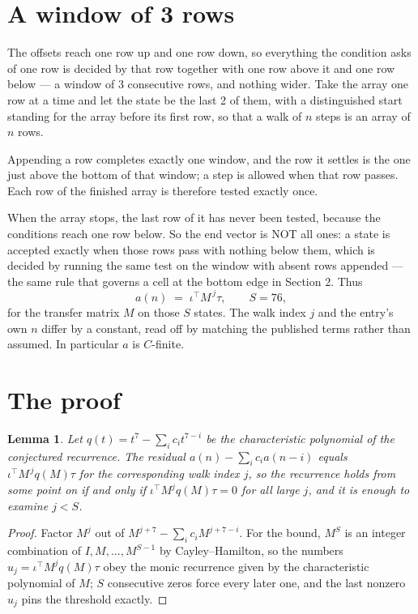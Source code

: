 \documentclass[11pt,a4paper]{article}
\theoremstyle{plain}
\newtheorem{lemma}[theorem]{Lemma}
\theoremstyle{definition}
\begin{document}
\section{A window of 3 rows}

The offsets reach one row up and one row down, so everything the condition asks of one row is
decided by that row together with one row above it and one row below --- a window of
$3$ consecutive rows, and nothing wider. Take the array one row at a time and
let the state be the last 2 of them, with a distinguished start standing for the array before its
first row, so that a walk of $n$ steps is an array of $n$ rows.

Appending a row completes exactly one window, and the row it settles is the one just above the bottom of that window; a step is
allowed when that row passes. Each row of the finished array is therefore tested exactly once.

When the array stops, the last row of it has never been tested, because the
conditions reach one row below. So the end vector is NOT all ones: a state is accepted exactly when
those rows pass with nothing below them, which is decided by running the same test on the window
with absent rows appended --- the same rule that governs a cell at the bottom edge in
Section 2.
Thus
\[
a(n)\;=\;\iota^{\!\top}M^{\,j}\tau ,\qquad S=76,
\]
for the transfer matrix $M$ on those $S$ states. The walk index $j$ and the entry's own $n$
differ by a constant, read off by matching the published terms rather than assumed. In
particular $a$ is $C$-finite.

\section{The proof}

\begin{lemma}\label{lem:crit}
Let $q(t)=t^{7}-\sum_i c_it^{7-i}$ be the characteristic polynomial of the
conjectured recurrence. The residual $a(n)-\sum_ic_ia(n-i)$ equals
$\iota^{\!\top}M^{\,j}q(M)\tau$ for the corresponding walk index $j$, so the recurrence
holds from some point on if and only if $\iota^{\!\top}M^{j}q(M)\tau=0$ for all large $j$,
and it is enough to examine $j<S$.
\end{lemma}

\begin{proof}
Factor $M^{j}$ out of $M^{j+7}-\sum_ic_iM^{j+7-i}$. For the bound, $M^{S}$
is an integer combination of $I,M,\dots,M^{S-1}$ by Cayley--Hamilton, so the numbers
$u_j=\iota^{\!\top}M^{j}q(M)\tau$ obey the monic recurrence given by the characteristic
polynomial of $M$; $S$ consecutive zeros force every later one, and the last nonzero $u_j$
pins the threshold exactly.
\end{proof}
\end{document}
